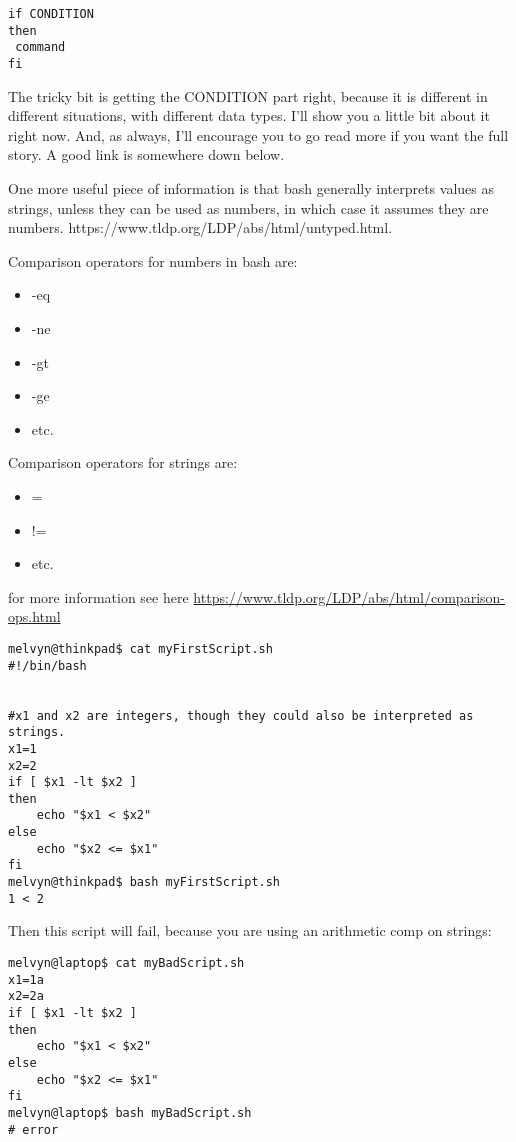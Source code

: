 \documentclass[12pt,a4paper]{article}
\begin{document}
\begin{verbatim}
if CONDITION
then
 command
fi
\end{verbatim}

The tricky bit is getting the CONDITION part right, because it is different in
different situations, with different data types. I'll show you a little bit
about it right now. And, as always, I'll encourage you to go read more if you
want the full story. A good link is somewhere down below.

One more useful piece of information is that bash generally interprets values as strings, unless they can be used as numbers, in which case it assumes they are numbers. https://www.tldp.org/LDP/abs/html/untyped.html.

Comparison operators for numbers in bash are:

\begin{itemize}
\item -eq
\item -ne
\item -gt
\item -ge 
\item etc.
\end{itemize}

Comparison operators for strings are:

\begin{itemize}
\item =
\item !=
\item etc.
\end{itemize}

for more information see here
\url{https://www.tldp.org/LDP/abs/html/comparison-ops.html}


\begin{lstlisting}[style=term]
melvyn@thinkpad$ cat myFirstScript.sh
#!/bin/bash


#x1 and x2 are integers, though they could also be interpreted as strings.
x1=1
x2=2
if [ $x1 -lt $x2 ]        
then
    echo "$x1 < $x2"
else
    echo "$x2 <= $x1"
fi
melvyn@thinkpad$ bash myFirstScript.sh
1 < 2
\end{lstlisting}


Then this script will fail, because you are using an arithmetic comp on strings:

\begin{lstlisting}[style=term]
melvyn@laptop$ cat myBadScript.sh
x1=1a
x2=2a
if [ $x1 -lt $x2 ]        
then
    echo "$x1 < $x2"
else
    echo "$x2 <= $x1"
fi
melvyn@laptop$ bash myBadScript.sh
# error
\end{lstlisting}
\end{document}

